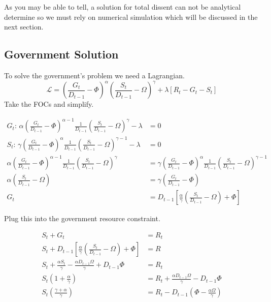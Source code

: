 \documentclass[12pt]{article}
\begin{document}
\begin{spacing}{1.5}
As you may be able to tell, a solution for total dissent can not be analytical determine so we must rely on numerical simulation which will be discussed in the next section. 


\subsection{Government Solution}

To solve the government's problem we need a Lagrangian.
\begin{equation}
\mathcal{L} = \left(\frac{G_t}{ D_{t-1}}-\Phi\right)^\alpha \left(\frac{S_t}{ D_{t-1}}-\Omega\right)^\gamma  +\lambda[R_t-G_t-S_t] 
\end{equation}
Take the FOCs and simplify.

\begin{equation}
    \begin{aligned}
        G_t\text{: } \alpha \left(\frac{G_t}{ D_{t-1}}-\Phi\right)^{\alpha-1} \frac{1}{ D_{t-1}} \left(\frac{S_t}{D_{t-1}}-\Omega\right)^\gamma  -\lambda &=0  \\
S_t\text{: } \gamma  \left(\frac{G_t}{ D_{t-1}}-\Phi\right)^{\alpha} \frac{1}{D_{t-1}} \left(\frac{S_t}{D_{t-1}}-\Omega\right)^{\gamma -1} -\lambda &=0 \\
\alpha \left(\frac{G_t}{D_{t-1}}-\Phi\right)^{\alpha-1} \frac{1}{ D_{t-1}} \left(\frac{S_t}{D_{t-1}}-\Omega\right)^\gamma  &= \gamma  \left(\frac{G_t}{ D_{t-1}}-\Phi\right)^{\alpha} \frac{1}{ D_{t-1}} \left(\frac{S_t}{ D_{t-1}}-\Omega\right)^{\gamma -1} \\
\alpha \left(\frac{S_t}{ D_{t-1}}-\Omega \right) &= \gamma  \left( \frac{G_t}{ D_{t-1}}-\Phi \right) \\
G_t&= D_{t-1}\left[\frac{\alpha}{\gamma } \left(\frac{S_t}{ D_{t-1}} -\Omega \right)+\Phi \right]
    \end{aligned}
\end{equation}


\noindent Plug this into the government resource constraint. 


\begin{equation}
    \begin{aligned}
        S_t+G_t&=R_t \\
        S_t+  D_{t-1}\left[\frac{\alpha}{\gamma } \left(\frac{S_t}{ D_{t-1}} -\Omega \right) +\Phi \right]  &= R \\
S_t+ \frac{\alpha S_t}{\gamma } -\frac{\alpha  D_{t-1} \Omega}{\gamma } +D_{t-1}\Phi &=R_t \\
S_t\left(1+\frac{\alpha}{\gamma }\right) &= R_t+ \frac{\alpha D_{t-1} \Omega}{\gamma } - D_{t-1}\Phi \\
S_t\left(\frac{\gamma  + \alpha}{\gamma }\right) &= R_t - D_{t-1} \left(\Phi - \frac{\alpha  \Omega}{\gamma } \right) 
    \end{aligned}
\end{equation}



\end{spacing}
\end{document}
